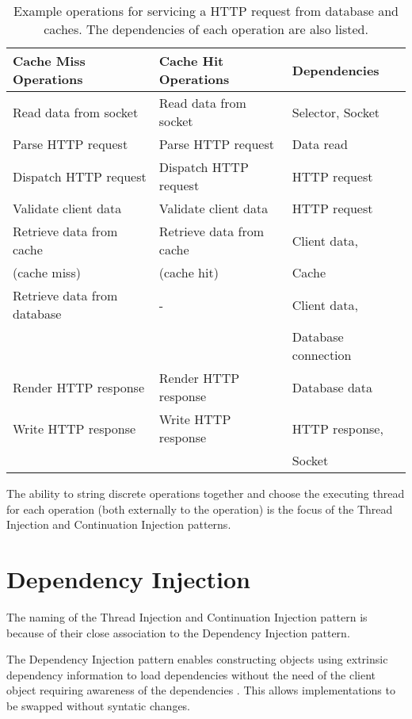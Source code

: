 \documentclass{article}
\begin{document}
\begin{table}[!h]
\renewcommand{\arraystretch}{1.3}
\centering
\begin{tabular}{l||l||l}
\hline
\bfseries Cache Miss Operations & \bfseries Cache Hit Operations & \bfseries Dependencies \\
\hline\hline
Read data from socket & Read data from socket & Selector, Socket \\
\hline
Parse HTTP request & Parse HTTP request & Data read \\
\hline
Dispatch HTTP request & Dispatch HTTP request & HTTP request \\
\hline
Validate client data & Validate client data & HTTP request \\
\hline
Retrieve data from cache & Retrieve data from cache & Client data, \\
(cache miss) & (cache hit) & Cache \\
\hline
Retrieve data from database & - & Client data, \\
 & & Database connection \\
\hline
Render HTTP response & Render HTTP response & Database data \\
\hline
Write HTTP response & Write HTTP response & HTTP response, \\ 
 & & Socket \\
\hline
\end{tabular}
\caption{Example operations for servicing a HTTP request from database and caches. The dependencies of each operation are also listed.}
\label{tab:example_request_operations}
\end{table}

The ability to string discrete operations together and choose the executing
thread for each operation (both externally to the operation) is the focus of the
Thread Injection and Continuation Injection patterns.


\section{Dependency Injection}

The naming of the Thread Injection and Continuation Injection pattern is because
of their close association to the Dependency Injection pattern.

The Dependency Injection pattern enables constructing objects using extrinsic
dependency information to load dependencies without the need of the client
object requiring awareness of the dependencies \cite{ioc}.  This allows
implementations to be swapped without syntatic changes.
\end{document}
